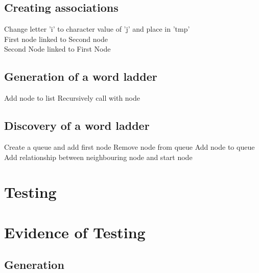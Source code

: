 \documentclass[10pt, a4paper]{article}
\begin{document}
\subsection{Creating associations}

\begin{algorithm}[H]
\SetAlgoLined
	 {
		 {
			 {
				Change letter 'i' to character value of 'j' and place in 'tmp'\\
				 {
					First node linked to Second node\\
					Second Node linked to First Node\\
				}
			}
		}
	}
\end{algorithm}

\subsection{Generation of a word ladder}

\begin{algorithm}[H]
\SetAlgoLined
	Add node to list
	 {
		 {
			Recursively call with node
		}
	}
\end{algorithm}

\subsection{Discovery of a word ladder}

\begin{algorithm}[H]
\SetAlgoLined
	Create a queue and add first node
	 {
		Remove node from queue
		 {
			Add node to queue
			Add relationship between neighbouring node and start node
		}
	}
\end{algorithm}

\section{Testing}

\section{Evidence of Testing}

\subsection{Generation}
\end{document}

